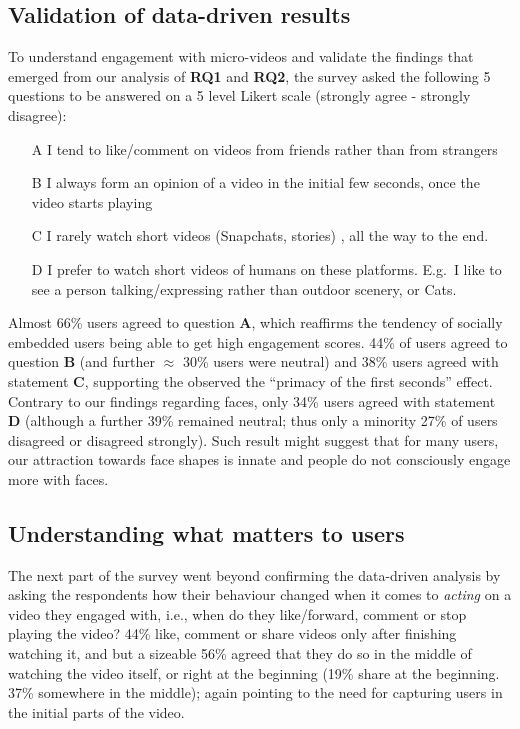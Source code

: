 \subsection{Validation of data-driven results}
To understand engagement with micro-videos and validate the findings that emerged from our analysis of \textbf{RQ1} and \textbf{RQ2}, the survey asked the following 5 questions
to be answered on a 5 level Likert scale (strongly agree - strongly disagree):
\begin{enumerate}
    \small 
    \item [A] I tend to like/comment on videos from friends rather than from strangers
    \item [B] I always form an opinion of a video in the initial few seconds, once the video starts playing
    \item [C] I rarely watch short videos (Snapchats, stories) , all the way to the end.
    \item [D] I prefer to watch short videos of humans on these platforms. E.g.\ I like to see a person talking/expressing rather than outdoor scenery, or Cats.
\end{enumerate}

Almost 66\% users agreed to question \textbf{A}, which reaffirms the tendency of socially embedded users being able to get high engagement scores. 44\% of users agreed to question \textbf{B} (and further $\approx$ 30\% users were neutral) and 38\% users agreed with statement \textbf{C}, supporting the observed the ``primacy of the first seconds'' effect.
Contrary to our findings regarding faces, only 34\% users agreed with statement  \textbf{D} (although a further 39\% remained neutral; thus only a minority 27\% of users disagreed or disagreed strongly). Such result might suggest that for many users, our attraction towards face shapes is innate \cite{slater1998innate} and people do not consciously engage more with faces. %

\subsection{Understanding what matters to users}
The next part of the survey went beyond confirming the data-driven analysis by asking the respondents how their behaviour changed when it comes to \emph{acting} on a video they engaged with, i.e., when do they like/forward, comment or stop playing the video? 44\% like, comment or share videos only after finishing watching it, and but a sizeable 56\% agreed that they do so in the middle of watching the video itself, or right at the beginning (19\% share at the beginning. 37\% somewhere in the middle); again pointing to the need for capturing users in the initial parts of the video. 

